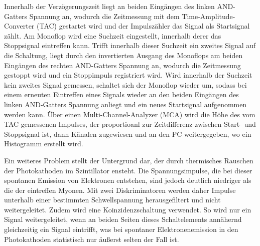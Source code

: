 Innerhalb der Verzögerungszeit liegt an beiden Eingängen des linken AND-Gatters
Spannung an, wodurch die Zeitmessung mit dem  Time-Amplitude-Converter (TAC)
gestartet wird und der Impulszähler das Signal als Startsignal zählt. Am Monoflop wird eine Suchzeit eingestellt,
innerhalb derer das Stoppsignal eintreffen kann. Trifft innerhalb dieser Suchzeit ein zweites Signal 
auf die Schaltung, liegt durch den invertierten Ausgang des Monoflops am beiden Eingängen des rechten 
AND-Gatters Spannung an, wodurch die Zeitmessung gestoppt wird und ein Stoppimpuls registriert wird. 
Wird innerhalb der Suchzeit kein zweites Signal gemessen, schaltet sich der Monoflop wieder um, sodass 
bei einem erneuten Eintreffen eines Signals wieder an den beiden Eingängen des linken AND-Gatters Spannung
anliegt und ein neues Startsignal aufgenommen werden kann. Über einen Multi-Channel-Analyzer (MCA) wird
die Höhe des vom TAC gemessenen Impulses, der proportioanl zur Zeitdifferenz zwischen Start- und 
Stoppsignal ist, dann Känalen zugewiesen und an den PC weitergegeben, wo ein Histogramm erstellt wird.

Ein weiteres Problem stellt der Untergrund dar, der durch thermisches Rauschen der Photokathoden im Szintillator
ensteht. Die Spannungsimpulse, die bei dieser spontanen Emission von Elektronen entstehen, sind jedoch 
deutlich niedriger als die der eintreffen Myonen. Mit zwei Diskriminatoren werden daher Impulse unterhalb einer 
bestimmten Schwellspannung herausgefiltert und nicht weitergeleitet. Zudem wird eine Koinzidenzschaltung
verwendet. So wird nur ein Signal weitergeleitet, wenn an beiden Seiten dieses Schaltelements 
annähernd gleichzeitig ein Signal eintrifft, was bei spontaner Elektronenemission in den Photokathoden 
statistisch nur äußerst selten der Fall ist.